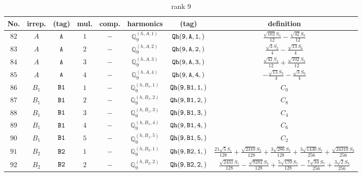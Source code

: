 \documentclass[fleqn,8pt]{jsarticle}
\begin{document}
\begin{table}[ht!]
\begin{center}
\caption{rank 9}
\renewcommand{\arraystretch}{1.3}
\begin{tabular}{cccccccc} \hline \hline
No. & irrep. & (tag) & mul. & comp. & harmonics & (tag) & definition \\ \hline
$ 82 $ & $ A $ & $ {\tt A} $ & $ 1 $ & $ - $ & $ \mathbb{Q}_{9}^{(h,A,1)} $ & $ {\tt Qh(9,A,1,)} $ & $ \frac{\sqrt{102} S_{4}}{12} - \frac{\sqrt{42} S_{8}}{12} $ \\
$ 83 $ & $ A $ & $ {\tt A} $ & $ 2 $ & $ - $ & $ \mathbb{Q}_{9}^{(h,A,2)} $ & $ {\tt Qh(9,A,2,)} $ & $ \frac{\sqrt{3} S_{2}}{4} - \frac{\sqrt{13} S_{6}}{4} $ \\
$ 84 $ & $ A $ & $ {\tt A} $ & $ 3 $ & $ - $ & $ \mathbb{Q}_{9}^{(h,A,3)} $ & $ {\tt Qh(9,A,3,)} $ & $ \frac{\sqrt{42} S_{4}}{12} + \frac{\sqrt{102} S_{8}}{12} $ \\
$ 85 $ & $ A $ & $ {\tt A} $ & $ 4 $ & $ - $ & $ \mathbb{Q}_{9}^{(h,A,4)} $ & $ {\tt Qh(9,A,4,)} $ & $ - \frac{\sqrt{13} S_{2}}{4} - \frac{\sqrt{3} S_{6}}{4} $ \\
$ 86 $ & $ B_{1} $ & $ {\tt B1} $ & $ 1 $ & $ - $ & $ \mathbb{Q}_{9}^{(h,B_{1},1)} $ & $ {\tt Qh(9,B1,1,)} $ & $ C_{0} $ \\
$ 87 $ & $ B_{1} $ & $ {\tt B1} $ & $ 2 $ & $ - $ & $ \mathbb{Q}_{9}^{(h,B_{1},2)} $ & $ {\tt Qh(9,B1,2,)} $ & $ C_{8} $ \\
$ 88 $ & $ B_{1} $ & $ {\tt B1} $ & $ 3 $ & $ - $ & $ \mathbb{Q}_{9}^{(h,B_{1},3)} $ & $ {\tt Qh(9,B1,3,)} $ & $ C_{4} $ \\
$ 89 $ & $ B_{1} $ & $ {\tt B1} $ & $ 4 $ & $ - $ & $ \mathbb{Q}_{9}^{(h,B_{1},4)} $ & $ {\tt Qh(9,B1,4,)} $ & $ C_{6} $ \\
$ 90 $ & $ B_{1} $ & $ {\tt B1} $ & $ 5 $ & $ - $ & $ \mathbb{Q}_{9}^{(h,B_{1},5)} $ & $ {\tt Qh(9,B1,5,)} $ & $ C_{2} $ \\
$ 91 $ & $ B_{2} $ & $ {\tt B2} $ & $ 1 $ & $ - $ & $ \mathbb{Q}_{9}^{(h,B_{2},1)} $ & $ {\tt Qh(9,B2,1,)} $ & $ \frac{21 \sqrt{5} S_{1}}{128} + \frac{\sqrt{2310} S_{3}}{128} + \frac{3 \sqrt{286} S_{5}}{128} + \frac{3 \sqrt{1430} S_{7}}{256} + \frac{\sqrt{24310} S_{9}}{256} $ \\
$ 92 $ & $ B_{2} $ & $ {\tt B2} $ & $ 2 $ & $ - $ & $ \mathbb{Q}_{9}^{(h,B_{2},2)} $ & $ {\tt Qh(9,B2,2,)} $ & $ \frac{\sqrt{2431} S_{1}}{128} - \frac{\sqrt{9282} S_{3}}{128} + \frac{5 \sqrt{170} S_{5}}{128} - \frac{7 \sqrt{34} S_{7}}{256} + \frac{3 \sqrt{2} S_{9}}{256} $ \\

\end{tabular}
\end{center}
\end{table}
\end{document}
